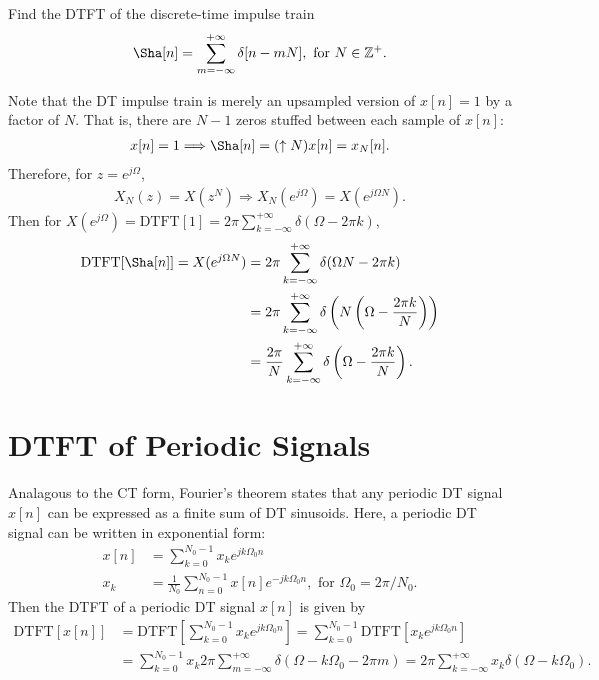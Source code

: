 \documentclass{report}
\begin{document}
\begin{example}
    Find the DTFT of the discrete-time impulse train 
    \begin{align*}
        \Sha[n] = \sum_{m=-\infty}^{+\infty}\delta[n-mN], \text{ for } N\in\mathbb{Z}^+.
    \end{align*}
\end{example}
\begin{solution}
    Note that the DT impulse train is merely an upsampled version of $x[n]=1$ by a factor of $N$. That is, there are $N-1$ zeros stuffed 
    between each sample of $x[n]$:
    \begin{align*}
        x[n] = 1 \Longrightarrow \Sha[n] = (\uparrow N)x[n] = x_N[n].
    \end{align*}
    Therefore, for $z=e^{j\Omega}$,
    \begin{align*}
        X_N(z) = X(z^N) \Longrightarrow X_N(e^{j\Omega}) = X(e^{j\Omega N}).
    \end{align*}
    Then for $X(e^{j\Omega}) = \text{DTFT}[1] = 2\pi\sum_{k=-\infty}^{+\infty}\delta(\Omega-2\pi k)$,
    \begin{align*}
        \text{DTFT}[\Sha[n]] = X(e^{j\Omega N}) &= 2\pi\sum_{k=-\infty}^{+\infty}\delta(\Omega N-2\pi k) \\
        &= 2\pi\sum_{k=-\infty}^{+\infty}\delta\left(N\left(\Omega -\frac{2\pi k}{N}\right)\right) \\
        &= \frac{2\pi}{N}\sum_{k=-\infty}^{+\infty}\delta\left(\Omega -\frac{2\pi k}{N}\right).
    \end{align*}
\end{solution}

\section{DTFT of Periodic Signals}
Analagous to the CT form, Fourier's theorem states that any periodic DT signal $x[n]$ can be expressed as a finite sum of DT sinusoids. Here, a periodic DT signal can be 
written in exponential form: 
\begin{align}
    x[n] &= \sum_{k=0}^{N_0-1} x_k e^{jk\Omega_0 n}  \\
    x_k &= \frac{1}{N_0}\sum_{n=0}^{N_0-1} x[n]e^{-jk\Omega_0 n}, \text{ for } \Omega_0 = 2\pi/N_0.
\end{align}
Then the DTFT of a periodic DT signal $x[n]$ is given by 
\begin{align}
    \text{DTFT}[x[n]] &= \text{DTFT}\left[\sum_{k=0}^{N_0-1} x_k e^{jk\Omega_0 n}\right] = \sum_{k=0}^{N_0-1} \text{DTFT}[x_k e^{jk\Omega_0 n}] \\
    &= \sum_{k=0}^{N_0-1} x_k 2\pi \sum_{m=-\infty}^{+\infty}\delta(\Omega - k\Omega_0 - 2\pi m) = 2\pi \sum_{k=-\infty}^{+\infty}x_k\delta(\Omega - k\Omega_0).
\end{align}
\end{document}

